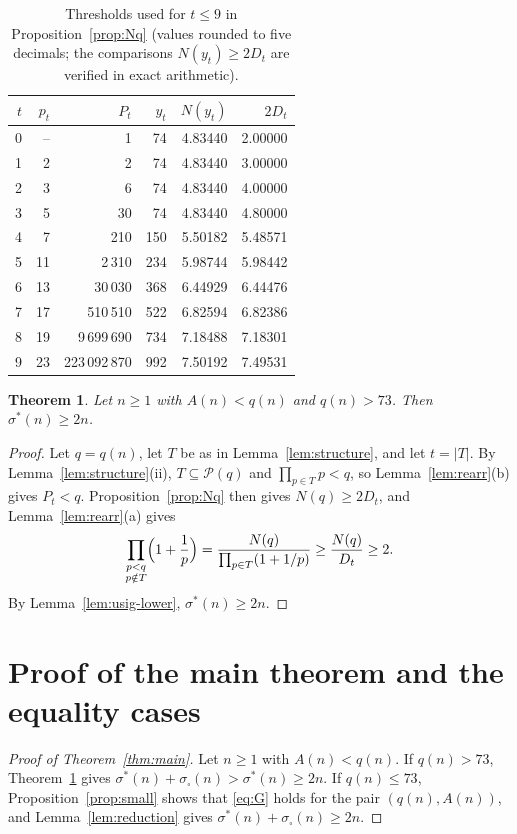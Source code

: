\documentclass[11pt,a4paper]{amsart}
\newtheorem{theorem}{Theorem}[section]
\theoremstyle{definition}
\theoremstyle{remark}
\newcommand{\usig}{\sigma^{*}}
\newcommand{\ssq}{\sigma_{\square}}
\begin{document}
\begin{table}[ht]
\centering\small
\begin{tabular}{rrrrrr}
\toprule
$t$ & $p_t$ & $P_t$ & $y_t$ & $N(y_t)$ & $2D_t$\\
\midrule
0 & -- & 1 & 74 & 4.83440 & 2.00000\\
1 & 2 & 2 & 74 & 4.83440 & 3.00000\\
2 & 3 & 6 & 74 & 4.83440 & 4.00000\\
3 & 5 & 30 & 74 & 4.83440 & 4.80000\\
4 & 7 & 210 & 150 & 5.50182 & 5.48571\\
5 & 11 & 2\,310 & 234 & 5.98744 & 5.98442\\
6 & 13 & 30\,030 & 368 & 6.44929 & 6.44476\\
7 & 17 & 510\,510 & 522 & 6.82594 & 6.82386\\
8 & 19 & 9\,699\,690 & 734 & 7.18488 & 7.18301\\
9 & 23 & 223\,092\,870 & 992 & 7.50192 & 7.49531\\
\bottomrule
\end{tabular}
\caption{Thresholds used for $t\le9$ in Proposition~\ref{prop:Nq} (values rounded to five decimals; the comparisons $N(y_t)\ge 2D_t$ are verified in exact arithmetic).}\label{tab:thresholds}
\end{table}

\begin{theorem}\label{thm:large}
Let $n\ge1$ with $A(n)<q(n)$ and $q(n)>73$. Then $\usig(n)\ge 2n$.
\end{theorem}

\begin{proof}
Let $q=q(n)$, let $T$ be as in Lemma~\ref{lem:structure}, and let $t=|T|$. By Lemma~\ref{lem:structure}(ii), $T\subseteq\mathcal{P}(q)$ and $\prod_{p\in T}p<q$, so Lemma~\ref{lem:rearr}(b) gives $P_t<q$. Proposition~\ref{prop:Nq} then gives $N(q)\ge 2D_t$, and Lemma~\ref{lem:rearr}(a) gives
\[
  \prod_{\substack{p<q\\p\notin T}}\Bigl(1+\frac1p\Bigr) = \frac{N(q)}{\prod_{p\in T}(1+1/p)} \ge \frac{N(q)}{D_t} \ge 2 .
\]
By Lemma~\ref{lem:usig-lower}, $\usig(n)\ge 2n$.
\end{proof}

\section{Proof of the main theorem and the equality cases}\label{sec:main}

\begin{proof}[Proof of Theorem~\ref{thm:main}]
Let $n\ge1$ with $A(n)<q(n)$. If $q(n)>73$, Theorem~\ref{thm:large} gives $\usig(n)+\ssq(n) > \usig(n) \ge 2n$. If $q(n)\le 73$, Proposition~\ref{prop:small} shows that \eqref{eq:G} holds for the pair $(q(n),A(n))$, and Lemma~\ref{lem:reduction} gives $\usig(n)+\ssq(n)\ge 2n$.
\end{proof}
\end{document}
